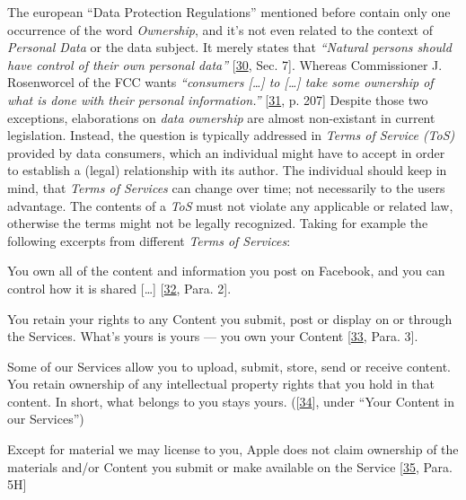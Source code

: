 \documentclass[12pt,english,a4paper,titlepage,cleardoublepage=empty,dottedtoc]{report}
\let\origquote\quote
\let\endorigquote\endquote
\renewenvironment{quote}{%
    \origquote
    \itshape
}
{\endorigquote}
\begin{document}
The european ``Data Protection Regulations'' mentioned before contain
only one occurrence of the word \emph{Ownership}, and it's not even
related to the context of \emph{Personal Data} or the data subject. It
merely states that \emph{``Natural persons should have control of their
own personal data''}
{[}\protect\hyperlink{ref-regulation_2016_eu_general-data-protection-regulation_ownership}{30},
Sec. 7{]}. Whereas Commissioner J. Rosenworcel of the FCC wants
\emph{``consumers {[}\ldots{}{]} to {[}\ldots{}{]} take some ownership
of what is done with their personal information.''}
{[}\protect\hyperlink{ref-rules_2016_fcc_to-protect-broadband-consumer-privacy_ownership}{31},
p. 207{]} Despite those two exceptions, elaborations on \emph{data
ownership} are almost non-existant in current legislation. Instead, the
question is typically addressed in \emph{Terms of Service (ToS)}
provided by data consumers, which an individual might have to accept in
order to establish a (legal) relationship with its author. The
individual should keep in mind, that \emph{Terms of Services} can change
over time; not necessarily to the users advantage. The contents of a
\emph{ToS} must not violate any applicable or related law, otherwise the
terms might not be legally recognized. Taking for example the following
excerpts from different \emph{Terms of Services}:

\begin{quote}
You own all of the content and information you post on Facebook, and you
can control how it is shared {[}\ldots{}{]}
{[}\protect\hyperlink{ref-web_2016_facebook_terms-of-service}{32}, Para.
2{]}.
\end{quote}

\begin{quote}
You retain your rights to any Content you submit, post or display on or
through the Services. What's yours is yours --- you own your Content
{[}\protect\hyperlink{ref-web_2016_twitter_terms-of-service}{33}, Para.
3{]}.
\end{quote}

\begin{quote}
Some of our Services allow you to upload, submit, store, send or receive
content. You retain ownership of any intellectual property rights that
you hold in that content. In short, what belongs to you stays yours.
({[}\protect\hyperlink{ref-web_2016_google_terms-of-service}{34}{]},
under ``Your Content in our Services'')
\end{quote}

\begin{quote}
Except for material we may license to you, Apple does not claim
ownership of the materials and/or Content you submit or make available
on the Service
{[}\protect\hyperlink{ref-web_2016_apple-icloud_terms-of-service}{35},
Para. 5H{]}
\end{quote}
\end{document}
